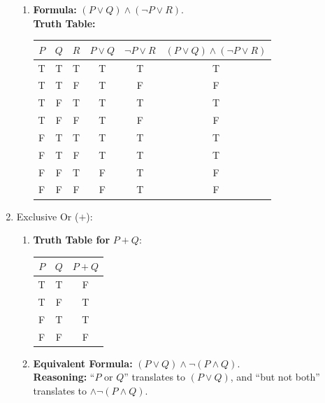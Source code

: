 \begin{enumerate}
\begin{enumerate}
  \item \textbf{Formula:} $(P \lor Q) \land (\neg P \lor R)$. \\
    \textbf{Truth Table:}
    \begin{center}
      \begin{tabular}{cccccc}
        $P$ & $Q$ & $R$ & $P \lor Q$ & $\neg P \lor R$ & $(P \lor Q) \land (\neg P \lor R)$ \\
        \midrule
        T & T & T & T & T & T \\
        T & T & F & T & F & F \\
        T & F & T & T & T & T \\
        T & F & F & T & F & F \\
        F & T & T & T & T & T \\ 
        F & T & F & T & T & T \\
        F & F & T & F & T & F \\
        F & F & F & F & T & F
      \end{tabular}
    \end{center}
  \end{enumerate}

\item Exclusive Or ($+$):
  \begin{enumerate}
  \item \textbf{Truth Table for } $P + Q$:
    \begin{center}
      \begin{tabular}{ccc}
        $P$ & $Q$ & $P + Q$ \\
        \midrule
        T & T & F \\
        T & F & T \\
        F & T & T \\
        F & F & F
      \end{tabular}
    \end{center}

  \item \textbf{Equivalent Formula:} $(P \lor Q) \land \neg (P \land Q)$. \\
    \textbf{Reasoning:} ``$P$ or $Q$'' translates to $(P \lor Q)$, and ``but not both'' translates to $\land \neg (P \land Q)$.
  \end{enumerate}


\end{enumerate}
